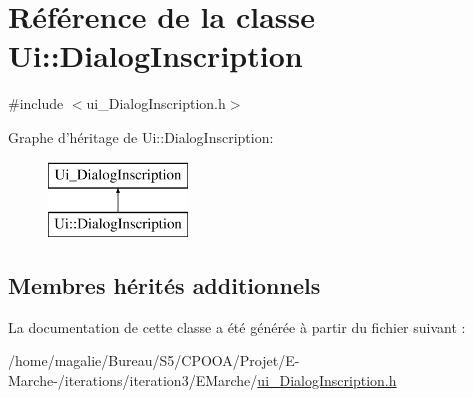 \hypertarget{class_ui_1_1_dialog_inscription}{\section{Référence de la classe Ui\-:\-:Dialog\-Inscription}
\label{class_ui_1_1_dialog_inscription}
}


{\ttfamily \#include $<$ui\-\_\-\-Dialog\-Inscription.\-h$>$}

Graphe d'héritage de Ui\-:\-:Dialog\-Inscription\-:\begin{figure}[H]
\begin{center}
\leavevmode
\includegraphics[height=2.000000cm]{class_ui_1_1_dialog_inscription}
\end{center}
\end{figure}
\subsection*{Membres hérités additionnels}


La documentation de cette classe a été générée à partir du fichier suivant \-:\begin{DoxyCompactItemize}
\item 
/home/magalie/\-Bureau/\-S5/\-C\-P\-O\-O\-A/\-Projet/\-E-\/\-Marche-\//iterations/iteration3/\-E\-Marche/\hyperlink{ui___dialog_inscription_8h}{ui\-\_\-\-Dialog\-Inscription.\-h}\end{DoxyCompactItemize}

